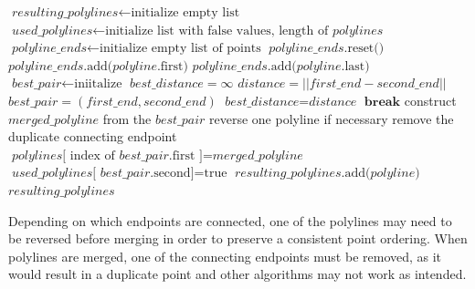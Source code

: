 {
\begin{algorithmic}[1]
	\State $\textit{resulting\_polylines} \gets \text{initialize empty list}$
	\State $\textit{used\_polylines} \gets \text{initialize list with false values, length of }\textit{polylines}$
	\State $\textit{polyline\_ends} \gets \text{initialize empty list of points}$
	\State
		\State $\textit{polyline\_ends}\text{.reset()}$
		\State
				\State $\textit{polyline\_ends}\text{.add(}\textit{polyline}\text{.first}\text{)}$
				\State $\textit{polyline\_ends}\text{.add(}\textit{polyline}\text{.last}\text{)}$
			\EndIf
		\EndFor
		\State
		\State $\textit{best\_pair} \gets \text{iniitalize}$
		\State $\textit{best\_distance} = \infty$
					\State $\textit{distance} = \left|\left|\textit{first\_end} - \textit{second\_end}\right|\right|$
					\State
						\State $\textit{best\_pair} = (\textit{first\_end}, \textit{second\_end})$
						\State $\textit{best\_distance} = \textit{distance}$
					\EndIf
				\EndIf
			\EndFor
		\EndFor
			\State $\textbf{break}$
		\EndIf
		\State
		\State construct $\textit{merged\_polyline}$ from the $\textit{best\_pair}$
		\State reverse one polyline if necessary
		\State remove the duplicate connecting endpoint
		\State
		\State $\textit{polylines}\text{[ index of }\textit{best\_pair}\text{.first ]} = \textit{merged\_polyline}$
		\State $\textit{used\_polylines}\text{[ }\textit{best\_pair}\text{.second}\text{]} = \text{true}$
	\EndWhile
	\State
			\State $\textit{resulting\_polylines}\text{.add(}\textit{polyline}\text{)}$
		\EndIf
	\EndFor
	\State
	\Return $\textit{resulting\_polylines}$
	\EndProcedure
\end{algorithmic}
}

Depending on which endpoints are connected, one of the polylines may need to be reversed before merging in order to preserve a consistent point ordering. When polylines are merged, one of the connecting endpoints must be removed, as it would result in a duplicate point and other algorithms may not work as intended.


